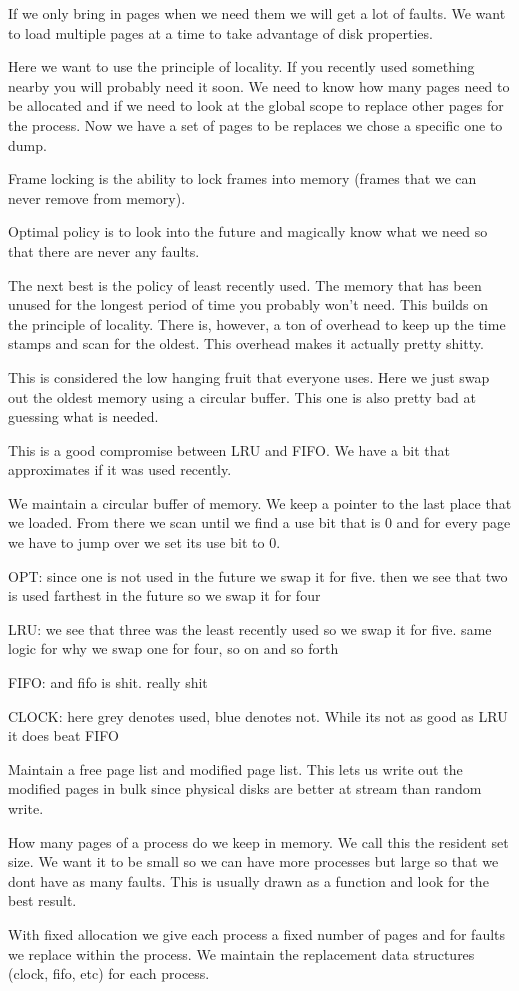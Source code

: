 \documentclass{article}
\begin{document}

If we only bring in pages when we need them we will get a lot of faults. We want to load multiple pages at a time to take advantage of disk properties.



Here we want to use the principle of locality. If you recently used something nearby you will probably need it soon. We need to know how many pages need to be allocated and if we need to look at the global scope to replace other pages for the process. Now we have a set of pages to be replaces we chose a specific one to dump.

Frame locking is the ability to lock frames into memory (frames that we can never remove from memory).

Optimal policy is to look into the future and magically know what we need so that there are never any faults.

The next best is the policy of least recently used. The memory that has been unused for the longest period of time you probably won't need. This builds on the principle of locality. There is, however, a ton of overhead to keep up the time stamps and scan for the oldest. This overhead makes it actually pretty shitty.

This is considered the low hanging fruit that everyone uses. Here we just swap out the oldest memory using a circular buffer. This one is also pretty bad at guessing what is needed.

This is a good compromise between LRU and FIFO. We have a bit that approximates if it was used recently.

We maintain a circular buffer of memory. We keep a pointer to the last place that we loaded. From there we scan until we find a use bit that is 0 and for every page we have to jump over we set its use bit to 0.


OPT: since one is not used in the future we swap it for five. then we see that two is used farthest in the future so we swap it for four

LRU: we see that three was the least recently used so we swap it for five. same logic for why we swap one for four, so on and so forth

FIFO: and fifo is shit. really shit

CLOCK: here grey denotes used, blue denotes not. While its not as good as LRU it does beat FIFO

Maintain a free page list and modified page list. This lets us write out the modified pages in bulk since physical disks are better at stream than random write.

How many pages of a process do we keep in memory. We call this the resident set size. We want it to be small so we can have more processes but large so that we dont have as many faults. This is usually drawn as a function and look for the best result.

With fixed allocation we give each process a fixed number of pages and for faults we replace within the process. We maintain the replacement data structures (clock, fifo, etc) for each process.
\end{document}
